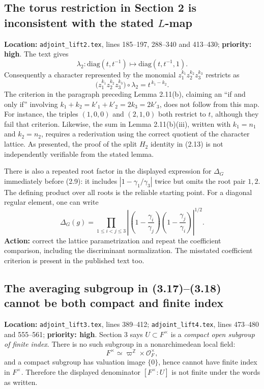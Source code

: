 \documentclass[12pt,letterpaper]{article}
\newcommand{\OF}{\mathcal O_F}
\begin{document}
\subsection{The torus restriction in Section 2 is inconsistent with the
stated $L$-map}
\label{issue:satake}

\textbf{Location:} \texttt{adjoint\_lift2.tex}, lines 185--197,
288--340 and 413--430; \textbf{priority: high}. The text gives
\[
\lambda_2:\mathrm{diag}(t,t^{-1})
\longmapsto\mathrm{diag}(t,t^{-1},1).
\]
Consequently a character represented by the monomial
$z_1^{k_1}z_2^{k_2}z_3^{k_3}$ restricts as
\[
\bigl(z_1^{k_1}z_2^{k_2}z_3^{k_3}\bigr)\circ\lambda_2
=t^{\,k_1-k_2}.
\]
The criterion in the paragraph preceding Lemma 2.11(b), claiming an
``if and only if'' involving
$k_1+k_2=k'_1+k'_2=2k_3=2k'_3$, does not follow
from this map. For instance, the triples $(1,0,0)$ and $(2,1,0)$
both restrict to $t$, although they fail that criterion. Likewise, the
sum in Lemma 2.11(b)(iii), written with $k_1=n_1$ and $k_2=n_2$,
requires a rederivation using the correct quotient of the character
lattice. As presented, the proof of the split $H_2$ identity in (2.13)
is not independently verifiable from the stated lemma.

There is also a repeated root factor in the displayed expression for
$\Delta_G$ immediately before (2.9): it includes
$|1-\gamma_1/\gamma_3|$ twice but omits the root pair $1,2$.
The defining product over all roots is the reliable starting point.
For a diagonal regular element, one can write
\[
\Delta_G(g)=\prod_{1\le i<j\le3}
\left|\left(1-\frac{\gamma_i}{\gamma_j}\right)
\left(1-\frac{\gamma_j}{\gamma_i}\right)\right|^{1/2}.
\]
\textbf{Action:} correct the lattice parametrization and repeat the
coefficient comparison, including the discriminant normalization. The
misstated coefficient criterion is present in the published text too.

\subsection{The averaging subgroup in (3.17)--(3.18) cannot be both compact
and finite index}
\label{issue:U}

\textbf{Location:} \texttt{adjoint\_lift3.tex}, lines 389--412;
\texttt{adjoint\_lift4.tex}, lines 473--480 and 555--561;
\textbf{priority: high}. Section 3 says
$U\subset F^\times$ is a \emph{compact open subgroup of finite index}.
There is no such subgroup in a nonarchimedean local field:
\[
F^\times\simeq\varpi^{\mathbb Z}\times\OF^\times,
\]
and a compact subgroup has valuation image $\{0\}$, hence cannot
have finite index in $F^\times$. Therefore the displayed denominator
$[F^\times:U]$ is not finite under the words as written.
\end{document}
